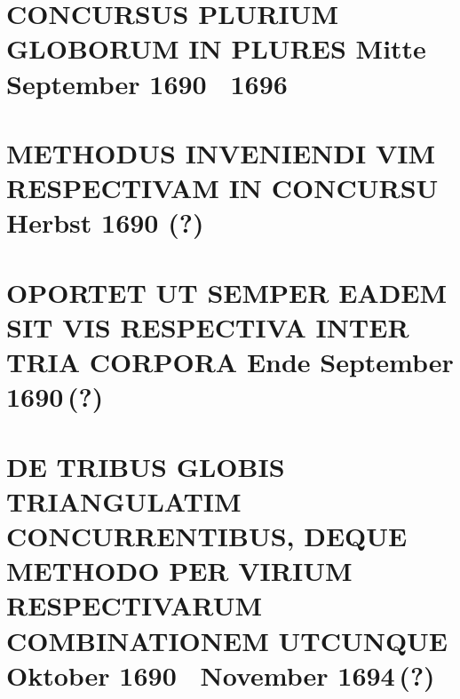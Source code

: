 \documentclass[%
fontsize=10pt,
]{scrbook}
\DeclareRobustCommand{\bracks}[1]{%
\textup{\lbrack}#1\textup{\rbrack}}
\begin{document}
\chapter[tocentry={Concursus plurium globorum in plures
\enskip \bracks{Mitte September 1690 \textendash\ 1696}},
head={Concursus plurium globorum in plures}]%
{\MakeUppercase{Concursus plurium globorum in plures}
\newline \bracks{Mitte September 1690 \textendash\ 1696}}

\label{42014}





\chapter[tocentry={Methodus inveniendi vim respectivam in concursu
\enskip\bracks{%
Herbst 1690 (?)%
}},
head={Methodus inveniendi vim respectivam in concursu}]%
{\MakeUppercase{Methodus inveniendi vim respectivam in concursu}
\newline\bracks{%
Herbst 1690 (?)%
}}%
\label{58949}





\chapter[tocentry={Oportet ut semper eadem sit vis respectiva inter tria corpora
\enskip \bracks{Ende September 1690\,(?)}},
head={Vis respectiva inter tria corpora}]%
{\MakeUppercase{Oportet ut semper eadem sit vis respectiva inter tria corpora}
\newline \bracks{Ende September 1690\,(?)}}

\label{53450}




\chapter[tocentry={De tribus globis triangulatim concurrentibus, deque methodo per virium respectivarum combinationem utcunque 
\enskip \bracks{Oktober 1690 \textendash\ November 1694\,(?)}},
head={De tribus globis triangulatim concurrentibus}]%
{\MakeUppercase{De tribus globis triangulatim concurrentibus, 
deque methodo per virium respectivarum combinationem utcunque}
\newline \bracks{Oktober 1690 \textendash\ November 1694\,(?)}}
\label{60298}

\end{document}
